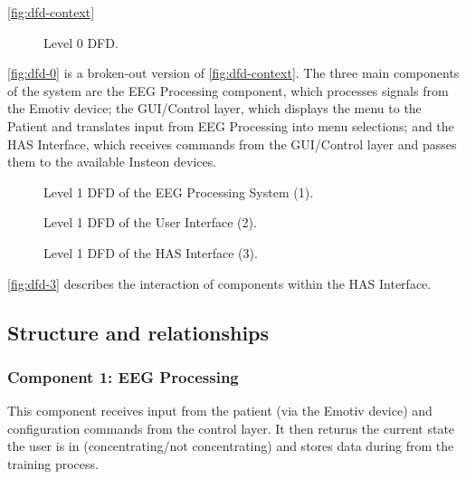 \documentclass{article}
\begin{document}
\autoref{fig:dfd-context}

\begin{figure}[h!]
    \centering
    \resizebox{\textwidth}{!}{
        
    }
    \caption{Level 0 DFD.}
    \label{fig:dfd-0}
\end{figure}

\autoref{fig:dfd-0} is a broken-out version of \autoref{fig:dfd-context}. The
three main components of the system are the EEG Processing component, which
processes signals from the Emotiv device; the GUI/Control layer, which
displays the menu to the Patient and translates input from EEG Processing into
menu selections; and the HAS Interface, which receives commands from the
GUI/Control layer and passes them to the available Insteon devices.

\begin{figure}[h!]
    \centering
    \resizebox{\textwidth}{!}{
        
    }
    \caption{Level 1 DFD of the EEG Processing System (1).}
    \label{fig:dfd-1}
\end{figure}

\begin{figure}[h!]
    \centering
    \resizebox{\textwidth}{!}{
        
    }
    \caption{Level 1 DFD of the User Interface (2).}
    \label{fig:dfd-2}
\end{figure}

\begin{figure}[h!]
    \centering
    \resizebox{\textwidth}{!}{
        
    }
    \caption{Level 1 DFD of the HAS Interface (3).}
    \label{fig:dfd-3}
\end{figure}

\autoref{fig:dfd-3} describes the interaction of components within the HAS
Interface.

\subsection{Structure and relationships}

\subsubsection{Component 1: EEG Processing}
This component receives input from the patient (via the Emotiv device) and
configuration commands from the control layer. It then returns the current
state the user is in (concentrating/not concentrating) and stores data
during from the training process.
\end{document}
